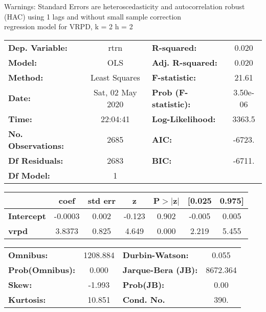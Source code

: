 Warnings: \newline
 [1] Standard Errors are heteroscedasticity and autocorrelation robust (HAC) using 1 lags and without small sample correction\\ 

regression model for VRPD, k = 2 h = 2\begin{center}
\begin{tabular}{lclc}
\toprule
\textbf{Dep. Variable:}    &       rtrn       & \textbf{  R-squared:         } &     0.020   \\
\textbf{Model:}            &       OLS        & \textbf{  Adj. R-squared:    } &     0.020   \\
\textbf{Method:}           &  Least Squares   & \textbf{  F-statistic:       } &     21.61   \\
\textbf{Date:}             & Sat, 02 May 2020 & \textbf{  Prob (F-statistic):} &  3.50e-06   \\
\textbf{Time:}             &     22:04:41     & \textbf{  Log-Likelihood:    } &    3363.5   \\
\textbf{No. Observations:} &        2685      & \textbf{  AIC:               } &    -6723.   \\
\textbf{Df Residuals:}     &        2683      & \textbf{  BIC:               } &    -6711.   \\
\textbf{Df Model:}         &           1      & \textbf{                     } &             \\
\bottomrule
\end{tabular}
\begin{tabular}{lcccccc}
                   & \textbf{coef} & \textbf{std err} & \textbf{z} & \textbf{P$> |$z$|$} & \textbf{[0.025} & \textbf{0.975]}  \\
\midrule
\textbf{Intercept} &      -0.0003  &        0.002     &    -0.123  &         0.902        &       -0.005    &        0.005     \\
\textbf{vrpd}      &       3.8373  &        0.825     &     4.649  &         0.000        &        2.219    &        5.455     \\
\bottomrule
\end{tabular}
\begin{tabular}{lclc}
\textbf{Omnibus:}       & 1208.884 & \textbf{  Durbin-Watson:     } &    0.055  \\
\textbf{Prob(Omnibus):} &   0.000  & \textbf{  Jarque-Bera (JB):  } & 8672.364  \\
\textbf{Skew:}          &  -1.993  & \textbf{  Prob(JB):          } &     0.00  \\
\textbf{Kurtosis:}      &  10.851  & \textbf{  Cond. No.          } &     390.  \\
\bottomrule
\end{tabular}
\end{center}

